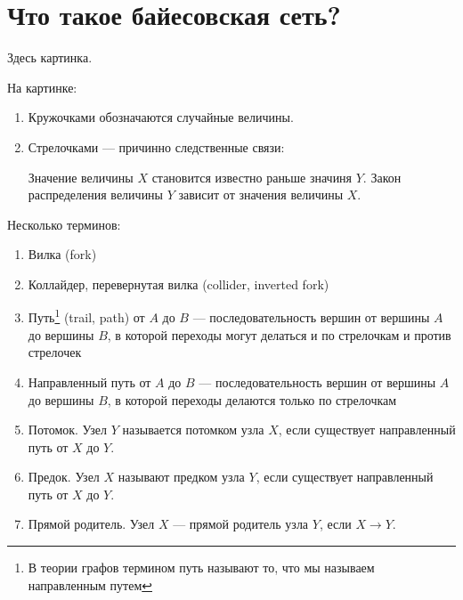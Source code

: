 \section{Что такое байесовская сеть?}

Здесь картинка.

На картинке:
\begin{enumerate}
\item Кружочками обозначаются случайные величины.
\item Стрелочками --- причинно следственные связи:


Значение величины $X$ становится известно раньше значиня $Y$. Закон распределения величины $Y$ зависит от значения величины $X$.
\end{enumerate}

Несколько терминов:
\begin{enumerate}
\item Вилка (fork)
\item Коллайдер, перевернутая вилка (collider, inverted fork)
\item Путь\footnote{В теории графов термином путь называют то, что мы называем направленным путем} (trail, path) от $A$ до $B$ --- последовательность вершин от вершины $A$ до вершины $B$, в которой переходы могут делаться и по стрелочкам и против стрелочек
\item Направленный путь от $A$ до $B$ --- последовательность вершин от вершины $A$ до вершины $B$, в которой переходы делаются только по стрелочкам
\item Потомок. Узел $Y$ называется потомком узла $X$, если существует направленный путь от $X$ до $Y$.
\item Предок. Узел $X$ называют предком узла $Y$, если существует направленный путь от $X$ до $Y$.
\item Прямой родитель. Узел $X$ --- прямой родитель узла $Y$, если $X\to Y$.

\end{enumerate}


